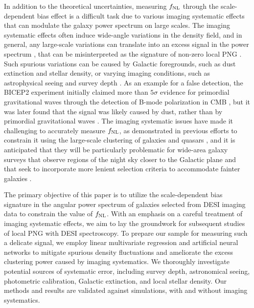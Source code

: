 In addition to the theoretical uncertainties, measuring $f_{\rm NL}$ through the scale-dependent bias effect is a difficult task due to various imaging systematic effects that can modulate the galaxy power spectrum on large scales. The imaging systematic effects often induce wide-angle variations in the density field, and in general, any large-scale variations can translate into an excess signal in the power spectrum \citep[see, e.g.,][]{huterer2013calibration}, that can be misinterpreted as the signature of non-zero local PNG \citep[see, e.g.,][]{PhysRevLett.106.241301}. Such spurious variations can be caused by Galactic foregrounds, such as dust extinction and stellar density, or varying imaging conditions, such as astrophysical seeing and survey depth \citep[see, e.g.,][]{ross2011}. As an example for a false detection, the BICEP2 experiment initially claimed more than $5\sigma$ evidence for primordial gravitational waves through the detection of B-mode polarization in CMB \citep{2014PhRvL.112x1101B}, but it was later found that the signal was likely caused by dust, rather than by primordial gravitational waves \citep{2014JCAP...08..039F,2014JCAP...10..035M}. The imaging systematic issues have made it challenging to accurately measure $f_{\rm NL}$, as demonstrated in previous efforts to constrain it using the large-scale clustering of galaxies and quasars \citep[see, e.g.,][]{2013MNRAS.428.1116R,pullen2013systematic, Ho2015JCAP...05..040H}, and it is anticipated that they will be particularly problematic for wide-area galaxy surveys that observe regions of the night sky closer to the Galactic plane and that seek to incorporate more lenient selection criteria to accommodate fainter galaxies \citep[see, e.g,][]{kitanidis2020imaging}.

The primary objective of this paper is to utilize the scale-dependent bias signature in the angular power spectrum of galaxies selected from DESI imaging data to constrain the value of $f_{\rm NL}$. With an emphasis on a careful treatment of imaging systematic effects, we aim to lay the groundwork for subsequent studies of local PNG with DESI spectroscopy. To prepare our sample for measuring such a delicate signal, we employ linear multivariate regression and artificial neural networks to mitigate spurious density fluctuations and ameliorate the excess clustering power caused by imaging systematics. We thoroughly investigate potential sources of systematic error, including survey depth, astronomical seeing, photometric calibration, Galactic extinction, and local stellar density. Our methods and results are validated against simulations, with and without imaging systematics.

